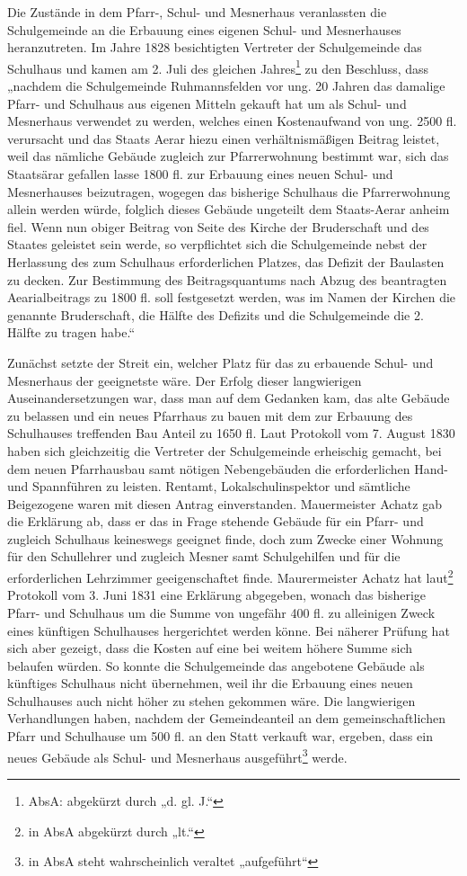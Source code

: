 \documentclass[12pt,a4paper]{book}
\begin{document}
Die Zustände in dem Pfarr-, Schul- und Mesnerhaus veranlassten die Schulgemeinde
an die Erbauung eines eigenen Schul- und Mesnerhauses heranzutreten. Im Jahre
1828 besichtigten Vertreter der Schulgemeinde das Schulhaus und kamen am 2. Juli
des gleichen Jahres\footnote{AbsA: abgekürzt durch „d. gl. J.“} zu den
Beschluss, dass „nachdem die Schulgemeinde Ruhmannsfelden vor ung. 20 Jahren das
damalige Pfarr- und Schulhaus aus eigenen Mitteln gekauft hat um als Schul- und
Mesnerhaus verwendet zu werden, welches einen Kostenaufwand von ung. 2500 fl.
verursacht und das Staats Aerar hiezu einen verhältnismäßigen Beitrag leistet,
weil das nämliche Gebäude zugleich zur Pfarrerwohnung bestimmt war, sich das
Staatsärar gefallen lasse 1800 fl. zur Erbauung eines neuen Schul- und
Mesnerhauses beizutragen, wogegen das bisherige Schulhaus die Pfarrerwohnung
allein werden würde, folglich dieses Gebäude ungeteilt dem Staats-Aerar anheim
fiel. Wenn nun obiger Beitrag von Seite des Kirche der Bruderschaft und des
Staates geleistet sein werde, so verpflichtet sich die Schulgemeinde nebst der
Herlassung des zum Schulhaus erforderlichen Platzes, das Defizit der Baulasten
zu decken. Zur Bestimmung des Beitragsquantums nach Abzug des beantragten
Aearialbeitrags zu 1800 fl. soll festgesetzt werden, was im Namen der Kirchen
die genannte Bruderschaft, die Hälfte des Defizits und die Schulgemeinde die 2.
Hälfte zu tragen habe.“

Zunächst setzte der Streit ein, welcher Platz für das zu erbauende Schul- und
Mesnerhaus der geeignetste wäre. Der Erfolg dieser langwierigen
Auseinandersetzungen war, dass man auf dem Gedanken kam, das alte Gebäude zu
belassen und ein neues Pfarrhaus zu bauen mit dem zur Erbauung des Schulhauses
treffenden Bau Anteil zu 1650 fl. Laut Protokoll vom 7. August 1830 haben sich
gleichzeitig die Vertreter der Schulgemeinde erheischig gemacht, bei dem neuen
Pfarrhausbau samt nötigen Nebengebäuden die erforderlichen Hand- und Spannführen
zu leisten. Rentamt, Lokalschulinspektor und sämtliche Beigezogene waren mit
diesen Antrag einverstanden. Mauermeister Achatz gab die Erklärung ab, dass er
das in Frage stehende Gebäude für ein Pfarr- und zugleich Schulhaus keineswegs
geeignet finde, doch zum Zwecke einer Wohnung für den Schullehrer und zugleich
Mesner samt Schulgehilfen und für die erforderlichen Lehrzimmer geeigenschaftet
finde. Maurermeister Achatz hat laut\footnote{in AbsA abgekürzt durch „lt.“}
Protokoll vom 3. Juni 1831 eine Erklärung abgegeben, wonach das bisherige Pfarr-
und Schulhaus um die Summe von ungefähr 400 fl. zu alleinigen Zweck eines
künftigen Schulhauses hergerichtet werden könne. Bei näherer Prüfung hat sich
aber gezeigt, dass die Kosten auf eine bei weitem höhere Summe sich belaufen
würden. So konnte die Schulgemeinde das angebotene Gebäude als künftiges
Schulhaus nicht übernehmen, weil ihr die Erbauung eines neuen Schulhauses auch
nicht höher zu stehen gekommen wäre. Die langwierigen Verhandlungen haben,
nachdem der Gemeindeanteil an dem gemeinschaftlichen Pfarr und Schulhause um 500
fl. an den Statt verkauft war, ergeben, dass ein neues Gebäude als Schul- und
Mesnerhaus ausgeführt\footnote{in AbsA steht wahrscheinlich veraltet
„aufgeführt“} werde.
\end{document}
